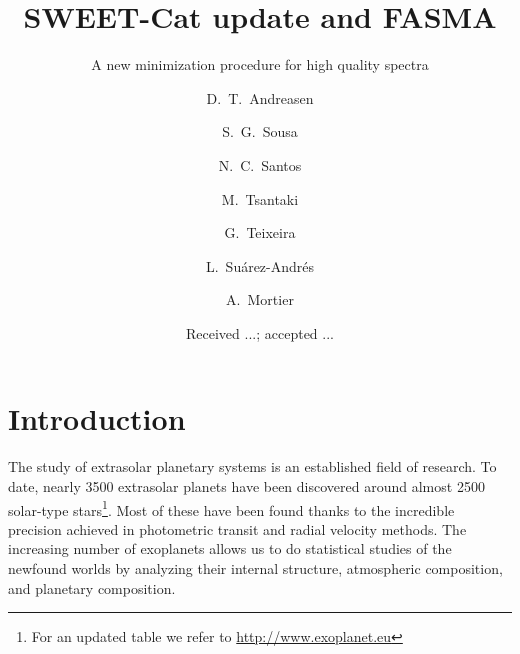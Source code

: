 \documentclass{aa}
\begin{document}
\title{SWEET-Cat update and FASMA}
\subtitle{A new minimization procedure for high quality spectra}


\author{ D.~T.~Andreasen
    \and S.~G.~Sousa
    \and N.~C.~Santos
    \and M.~Tsantaki
    \and G.~Teixeira
    \and L.~Su\'arez-Andr\'es
    \and A.~Mortier
}







\date{Received ...; accepted ...}

\abstract
{}
{}
{}
{}
{}



\maketitle



\section{Introduction}
\label{sec:introduction}
The study of extrasolar planetary systems is an established field of research.
To date, nearly 3500 extrasolar planets have been discovered around almost 2500
solar-type stars\footnote{For an updated table we refer to
\url{http://www.exoplanet.eu}}. Most of these have been found thanks to the
incredible precision achieved in photometric transit and radial velocity
methods. The increasing number of exoplanets allows us to do statistical studies
of the newfound worlds by analyzing their internal structure, atmospheric
composition, and planetary composition.
\end{document}
